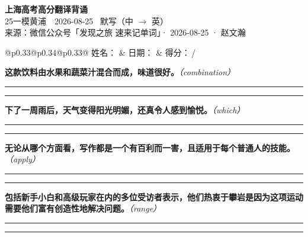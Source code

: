 \documentclass[11pt,a4paper]{article}
\newcommand{\num}[1]{\makebox[1.9em][r]{#1.}\hspace{0.3em}}
\newcommand{\wline}{\noindent\rule{\linewidth}{0.4pt}}
\newcommand{\prompt}[1]{\emph{\textcolor{tipblue}{\small（#1）}}}
\begin{document}
\pagestyle{plain}
\begin{center}
{\LARGE\bfseries 上海高考高分翻译背诵 }\\[0.25em]
{\large 25一模黄浦　2026-08-25 \quad\ 默写（中 $\to$ 英）}\\[0.35em]
{\footnotesize 来源：微信公众号「发现之旅 速来记单词」· 2026-08-25 · 赵文瀚}
\end{center}

\vspace{0.4em}
\noindent\begin{tabular}{@{}p{0.33\textwidth}@{}p{0.34\textwidth}@{}p{0.33\textwidth}@{}}
姓名：\underline{\hspace{2.0cm}} & 日期：\underline{\hspace{2.0cm}} & 得分：\underline{\hspace{1.4cm}}\,/ \\
\end{tabular}

\vspace{0.5em}

\vspace{0.8em}
\num{1}\textbf{这款饮料由水果和蔬菜汁混合而成，味道很好。}\prompt{combination}

\vspace{0.3em}

\wline\vspace{0.3em}
\wline

\num{2}\textbf{下了一周雨后，天气变得阳光明媚，还真令人感到愉悦。}\prompt{which}

\vspace{0.3em}

\wline\vspace{0.3em}
\wline

\num{3}\textbf{无论从哪个方面看，写作都是一个有百利而一害，且适用于每个普通人的技能。}\prompt{apply}

\vspace{0.3em}

\wline\vspace{0.3em}
\wline

\num{4}\textbf{包括新手小白和高级玩家在内的多位受访者表示，他们热衷于攀岩是因为这项运动需要他们富有创造性地解决问题。}\prompt{range}

\vspace{0.3em}

\wline\vspace{0.3em}
\wline
\end{document}
